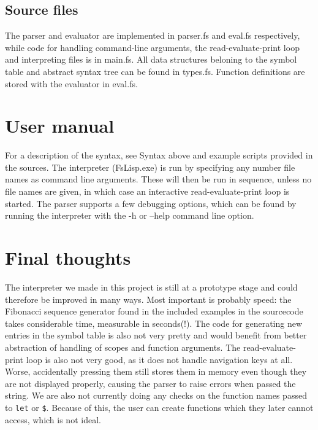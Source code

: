 \documentclass[11pt]{article}
\begin{document}
\subsection{Source files}

    The parser and evaluator are implemented in parser.fs and eval.fs respectively, while code for handling command-line arguments, the read-evaluate-print
    loop and interpreting files is in main.fs. All data structures beloning to the symbol table and abstract syntax tree can be found in types.fs.
    Function definitions are stored with the evaluator in eval.fs.

\section{User manual}

    For a description of the syntax, see Syntax above and example scripts provided in the sources.\newline
    The interpreter (FsLisp.exe) is run by specifying any number file names as command line arguments. These will then be run in sequence, unless
    no file names are given, in which case an interactive read-evaluate-print loop is started. The parser supports a few debugging options, which can
    be found by running the interpreter with the -h or --help command line option.

\newpage

\section{Final thoughts}

    The interpreter we made in this project is still at a prototype stage and could therefore be improved in many ways. Most important is probably speed:
    the Fibonacci sequence generator found in the included examples in the sourcecode takes considerable time, measurable in seconds(!). The code for
    generating new entries in the symbol table is also not very pretty and would benefit from better abstraction of handling of scopes and function
    arguments. The read-evaluate-print loop is also not very good, as it does not handle navigation keys at all. Worse, accidentally pressing them
    still stores them in memory even though they are not displayed properly, causing the parser to raise errors when passed the string. We are also
    not currently doing any checks on the function names passed to \lstinline{let} or \lstinline{$}. Because of this, the user can create functions which they later cannot
    access, which is not ideal.
\end{document}
